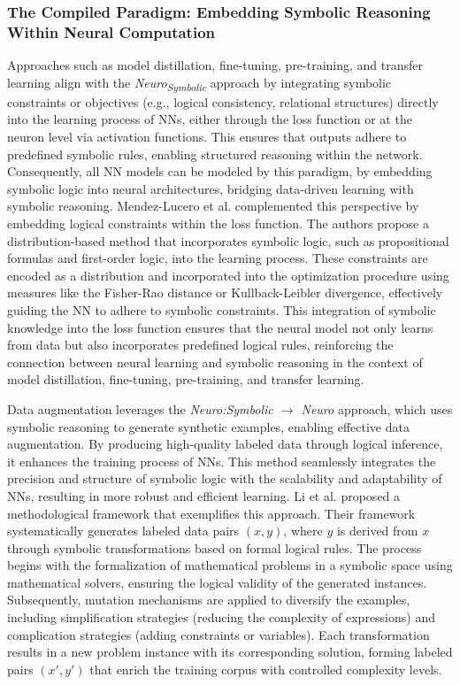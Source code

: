 \documentclass[12pt]{article}
\begin{document}
\subsubsection{The Compiled Paradigm: Embedding Symbolic Reasoning Within Neural Computation}
Approaches such as model distillation, fine-tuning, pre-training, and transfer learning align with the \textit{Neuro\textsubscript{Symbolic}} approach by integrating symbolic constraints or objectives (e.g., logical consistency, relational structures) directly into the learning process of NNs, either through the loss function or at the neuron level via activation functions. This ensures that outputs adhere to predefined symbolic rules, enabling structured reasoning within the network. Consequently, all NN models can be modeled by this paradigm, by embedding symbolic logic into neural architectures, bridging data-driven learning with symbolic reasoning. Mendez-Lucero et al. \cite{mendez2024semantic} complemented this perspective by embedding logical constraints within the loss function. The authors propose a distribution-based method that incorporates symbolic logic, such as propositional formulas and first-order logic, into the learning process. These constraints are encoded as a distribution and incorporated into the optimization procedure using measures like the Fisher-Rao distance or Kullback-Leibler divergence, effectively guiding the NN to adhere to symbolic constraints. This integration of symbolic knowledge into the loss function ensures that the neural model not only learns from data but also incorporates predefined logical rules, reinforcing the connection between neural learning and symbolic reasoning in the context of model distillation, fine-tuning, pre-training, and transfer learning.

Data augmentation leverages the \textit{Neuro:Symbolic $\to$ Neuro} approach, which uses symbolic reasoning to generate synthetic examples, enabling effective data augmentation. By producing high-quality labeled data through logical inference, it enhances the training process of NNs. This method seamlessly integrates the precision and structure of symbolic logic with the scalability and adaptability of NNs, resulting in more robust and efficient learning.
Li et al. \cite{li2024neuro} proposed a methodological framework that exemplifies this approach. Their framework systematically generates labeled data pairs \((x, y)\), where \(y\) is derived from \(x\) through symbolic transformations based on formal logical rules. The process begins with the formalization of mathematical problems in a symbolic space using mathematical solvers, ensuring the logical validity of the generated instances. Subsequently, mutation mechanisms are applied to diversify the examples, including simplification strategies (reducing the complexity of expressions) and complication strategies (adding constraints or variables). Each transformation results in a new problem instance with its corresponding solution, forming labeled pairs \((x', y')\) that enrich the training corpus with controlled complexity levels.
\end{document}
